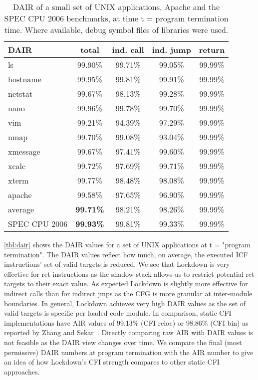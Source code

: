 \documentclass{acm_proc_article-sp}
\begin{document}
\begin{table*}[t!]
\begin{center}
\begin{tabular}{  l | c || c | c | c }
     DAIR & {\bf total } & ind. call & ind. jump & return \\ \hline
     ls & 99.90\% & 99.71\% & 99.05\% & 99.99\% \\ 
     hostname & 99.95\% & 99.81\% & 99.91\% & 99.99\% \\ 
     netstat & 99.67\% & 98.13\% & 99.28\% & 99.99\% \\ 
     nano & 99.96\% & 99.78\% & 99.70\% & 99.99\% \\ 
     vim & 99.21\% & 94.39\% & 97.29\% & 99.99\% \\ 
     nmap & 99.70\% & 99.08\% & 93.04\% & 99.99\% \\
xmessage & 99.67\% & 97.41\% & 99.60\% & 99.99\% \\ 
     xcalc & 99.72\% & 97.69\% & 99.71\% & 99.99\% \\
     xterm & 99.77\% & 98.48\% & 98.08\% & 99.99\% \\
     apache & 99.58\% & 97.65\% & 96.90\% & 99.99\% \\
    \hline
     average & {\bf 99.71\% } & 98.21\% & 98.26\% & 99.99\% \\
    \hline
     SPEC CPU 2006 & {\bf 99.93\% } & 99.81\% & 99.33\% & 99.99\% \\
    \end{tabular}
    \caption{DAIR of a small set of UNIX applications, Apache and the SPEC CPU 2006 benchmarks, at time t = program
    termination time. Where available, debug symbol files of libraries were used.}
	\label{tbl:dair}
\end{center}
\end{table*}



\autoref{tbl:dair} shows the DAIR values for a set of UNIX applications at
t = "program termination". The DAIR values reflect how much, on
average, the executed ICF instructions' set of valid targets is
reduced. We see that Lockdown is very effective for ret instructions as the
shadow stack allows us to restrict potential ret targets to their exact value.
As expected Lockdown is slightly more effective for indirect calls than for indirect jmps
as the CFG is more granular at inter-module boundaries.
In general, Lockdown achieves very high DAIR values as the set of valid targets
is specific per loaded code module. In comparison, static CFI implementations have AIR
values of 99.13\% (CFI reloc) or 98.86\% (CFI bin) as reported by Zhang and Sekar~\cite{zhang13security}.
Directly comparing raw AIR with DAIR values is not feasible as the DAIR view
changes over time. We compare the final (most permissive) DAIR numbers at
program termination with the AIR number to give an idea of how Lockdown's CFI
strength compares to other static CFI approaches.
\end{document}
